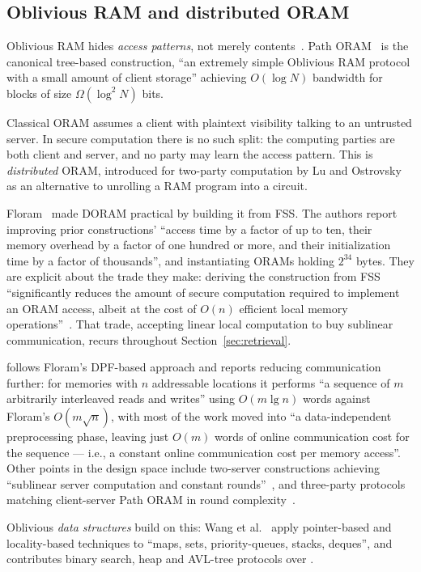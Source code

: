 \subsection{Oblivious RAM and distributed ORAM}
\label{sec:prim:oram}

Oblivious RAM hides \emph{access patterns}, not merely contents~\cite{goldreich1996}. Path
ORAM~\cite{pathoram2013} is the canonical tree-based construction, ``an extremely simple Oblivious
RAM protocol with a small amount of client storage'' achieving $O(\log N)$ bandwidth for blocks of
size $\Omega(\log^2 N)$ bits.

Classical ORAM assumes a client with plaintext visibility talking to an untrusted server. In
secure computation there is no such split: the computing parties are both client and server, and
no party may learn the access pattern. This is \emph{distributed} ORAM, introduced for two-party
computation by Lu and Ostrovsky~\cite{lu2013} as an alternative to unrolling a RAM program into a
circuit.

Floram~\cite{floram2017} made DORAM practical by building it from FSS. The authors report
improving prior constructions' ``access time by a factor of up to ten, their memory overhead by a
factor of one hundred or more, and their initialization time by a factor of thousands'', and
instantiating ORAMs holding $2^{34}$ bytes. They are explicit about the trade they make: deriving
the construction from FSS ``significantly reduces the amount of secure computation required to
implement an ORAM access, albeit at the cost of $O(n)$ efficient local memory
operations''~\cite{floram2017}. That trade, accepting linear local computation to buy sublinear
communication, recurs throughout Section~\ref{sec:retrieval}.

\duoram{} follows Floram's DPF-based approach and reports reducing communication further: for
memories with $n$ addressable locations it performs ``a sequence of $m$ arbitrarily interleaved
reads and writes'' using $O(m \lg n)$ words against Floram's $O(m\sqrt{n})$, with most of the work
moved into ``a data-independent preprocessing phase, leaving just $O(m)$ words of online
communication cost for the sequence --- i.e., a constant online communication cost per memory
access''. Other points in the design space include two-server constructions achieving ``sublinear
server computation and constant rounds''~\cite{hamlin2021}, and three-party protocols matching
client-server Path ORAM in round complexity~\cite{jarecki2018,bunn2020}.

Oblivious \emph{data structures} build on this: Wang et al.~\cite{wang2014} apply pointer-based
and locality-based techniques to ``maps, sets, priority-queues, stacks, deques'', and \prac{}
contributes binary search, heap and AVL-tree protocols over \duoramplain{}.

